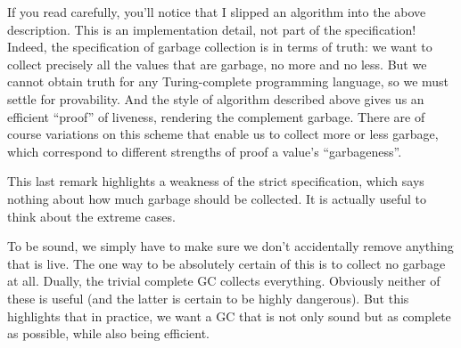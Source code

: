 
If you read carefully, you’ll notice that I slipped an algorithm into the above
description. This is an implementation detail, not part of the specification!
Indeed, the specification of garbage collection is in terms of truth: we want to
collect precisely all the values that are garbage, no more and no less. But we
cannot obtain truth for any Turing-complete programming language, so we must
settle for provability. And the style of algorithm described above gives us an
efficient “proof” of liveness, rendering the complement garbage. There are of
course variations on this scheme that enable us to collect more or less garbage,
which correspond to different strengths of proof a value’s “garbageness”.

This last remark highlights a weakness of the strict specification, which says
nothing about how much garbage should be collected. It is actually useful to
think about the extreme cases.


To be sound, we simply have to make sure we don’t accidentally remove anything
that is live. The one way to be absolutely certain of this is to collect no
garbage at all. Dually, the trivial complete GC collects everything. Obviously
neither of these is useful (and the latter is certain to be highly dangerous).
But this highlights that in practice, we want a GC that is not only sound but as
complete as possible, while also being efficient.
